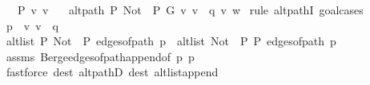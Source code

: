\begin{isabellebody}
\ \ \ {\isachardoublequoteopen}P\ {\isacharbraceleft}{\kern0pt}v{\isacharcomma}{\kern0pt}\ v{\isacharprime}{\kern0pt}{\isacharbraceright}{\kern0pt}{\isachardoublequoteclose}\isanewline
\ \ \ {\isachardoublequoteopen}alt{\isacharunderscore}{\kern0pt}path\ P\ {\isacharparenleft}{\kern0pt}Not\ {\isasymcirc}\ P{\isacharparenright}{\kern0pt}\ G\ {\isacharparenleft}{\kern0pt}{\isacharbrackleft}{\kern0pt}v{\isacharcomma}{\kern0pt}\ v{\isacharprime}{\kern0pt}{\isacharbrackright}{\kern0pt}\ {\isacharat}{\kern0pt}\ q{\isacharparenright}{\kern0pt}\ v\ w{\isachardoublequoteclose}\isanewline
%
\isadelimproof
%
\endisadelimproof
%
\isatagproof
{}\isamarkupfalse%
\ {\isacharparenleft}{\kern0pt}rule\ alt{\isacharunderscore}{\kern0pt}pathI{\isacharcomma}{\kern0pt}\ goal{\isacharunderscore}{\kern0pt}cases{\isacharparenright}{\kern0pt}\isanewline
\ \ \isamarkupfalse%
\ {}\isanewline
\ \ \isamarkupfalse%
\ {\isacharquery}{\kern0pt}p{\isacharprime}{\kern0pt}\ {\isacharequal}{\kern0pt}\ {\isachardoublequoteopen}{\isacharbrackleft}{\kern0pt}v{\isacharcomma}{\kern0pt}\ v{\isacharprime}{\kern0pt}{\isacharbrackright}{\kern0pt}\ {\isacharat}{\kern0pt}\ q{\isachardoublequoteclose}\isanewline
\ \ \isamarkupfalse%
\ {\isachardoublequoteopen}alt{\isacharunderscore}{\kern0pt}list\ P\ {\isacharparenleft}{\kern0pt}Not\ {\isasymcirc}\ P{\isacharparenright}{\kern0pt}\ {\isacharparenleft}{\kern0pt}edges{\isacharunderscore}{\kern0pt}of{\isacharunderscore}{\kern0pt}path\ {\isacharquery}{\kern0pt}p{\isacharprime}{\kern0pt}{\isacharparenright}{\kern0pt}\ {\isasymor}\ alt{\isacharunderscore}{\kern0pt}list\ {\isacharparenleft}{\kern0pt}Not\ {\isasymcirc}\ P{\isacharparenright}{\kern0pt}\ P\ {\isacharparenleft}{\kern0pt}edges{\isacharunderscore}{\kern0pt}of{\isacharunderscore}{\kern0pt}path\ {\isacharquery}{\kern0pt}p{\isacharprime}{\kern0pt}{\isacharparenright}{\kern0pt}{\isachardoublequoteclose}\isanewline
\ \ \ \ \isamarkupfalse%
\ assms{\isacharparenleft}{\kern0pt}{}{\isacharparenright}{\kern0pt}\ Berge{\isachardot}{\kern0pt}edges{\isacharunderscore}{\kern0pt}of{\isacharunderscore}{\kern0pt}path{\isacharunderscore}{\kern0pt}append{\isacharbrackleft}{\kern0pt}of\ p\ {\isacharquery}{\kern0pt}p{\isacharprime}{\kern0pt}{\isacharbrackright}{\kern0pt}\isanewline
\ \ \ \ \isamarkupfalse%
\ {\isacharparenleft}{\kern0pt}fastforce\ dest{\isacharcolon}{\kern0pt}\ alt{\isacharunderscore}{\kern0pt}pathD{\isacharparenleft}{\kern0pt}{}{\isacharparenright}{\kern0pt}\ dest{\isacharcolon}{\kern0pt}\ alt{\isacharunderscore}{\kern0pt}list{\isacharunderscore}{\kern0pt}append{\isacharunderscore}{\kern0pt}{}{\isacharparenright}{\kern0pt}\isanewline

\end{isabellebody}
